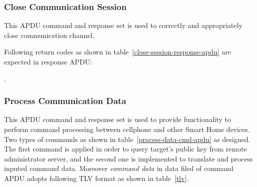 \subsubsection{Close Communication Session}\label{secSessionClose}
This APDU command and response set is used to correctly and appropriately close communication channel.


\begin{table}[!htb]
\caption{Close Session Command APDU}
\label{close-session-apdu}
\end{table}

Following return codes as shown in table~\ref{close-session-response-apdu} are expected in response APDU:

.\begin{table}[!htb]
\caption{Close Session Return Code}
\label{close-session-response-apdu}
\end{table}

\subsubsection{Process Communication Data }\sloppy
\begin{table}[!htb]
\caption{Process Data Command APDUs}
\label{process-data-cmd-apdu}
\end{table}
This APDU command and response set is used to provide functionality to perform command processing between cellphone and other Smart Home devices. Two types of commands as shown in table~\ref{process-data-cmd-apdu} as designed. The first command is applied in order to query target's public key from remote administrator server, and the second one is implemented to translate and process inputed command data.
Moreover \emph{command data} in data filed of command APDU adopts following TLV format as shown in table~\ref{tlv}. 

